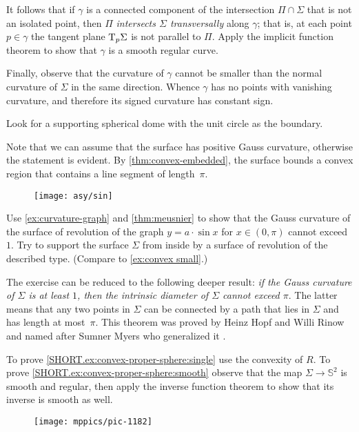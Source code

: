 It follows that if $\gamma$ is a connected component of the intersection $\Pi\cap\Sigma$ that is not an isolated point,
then $\Pi$ \emph{intersects $\Sigma$ transversally} along $\gamma$;
that is, at each point $p \in \gamma$ the tangent plane $\mathrm{T}_p\Sigma$ is not parallel to $\Pi$.
Apply the implicit function theorem to show that $\gamma$ is a smooth regular curve.

Finally, observe that the curvature of $\gamma$ cannot be smaller than the normal curvature of $\Sigma$ in the same direction.
Whence $\gamma$ has no points with vanishing curvature, and therefore its signed curvature has constant sign.


Look for a supporting spherical dome with the unit circle as the boundary.

Note that we can assume that the surface has positive Gauss curvature, otherwise the statement is evident.
By \ref{thm:convex-embedded}, the surface bounds a convex region that contains a line segment of length~$\pi$.

\begin{figure}[h!]
\vskip-0mm
\centering
\texttt{[image: asy/sin]}
\vskip-0mm
\end{figure}

Use \ref{ex:curvature-graph} and \ref{thm:meusnier} to show that the Gauss curvature of the surface of revolution of the graph $y=a\cdot \sin x$ for $x\in(0,\pi)$ cannot exceed $1$.
Try to support the surface $\Sigma$ from inside by a surface of revolution of the described type.
(Compare to \ref{ex:convex small}.)

The exercise can be reduced to the following deeper result: {}\emph{if the Gauss curvature of $\Sigma$ is at least $1$,
then
the intrinsic diameter of $\Sigma$ cannot exceed $\pi$}.
The latter means that any two points in $\Sigma$ can be connected by a path that lies in $\Sigma$ and has length at most~$\pi$.
This theorem was proved by Heinz Hopf and Willi Rinow \cite{hopf-rinow} and 
named after Sumner Myers who generalized it \cite{myers}.

To prove \ref{SHORT.ex:convex-proper-sphere:single} use the convexity of $R$.
To prove \ref{SHORT.ex:convex-proper-sphere:smooth} observe that the map $\Sigma\to\mathbb{S}^2$ is smooth and regular, then apply the inverse function theorem to show that its inverse is smooth as well.

\begin{wrapfigure}[16]{r}{29 mm}
\vskip-6mm
\centering
\texttt{[image: mppics/pic-1182]}
\vskip-0mm
\end{wrapfigure}

